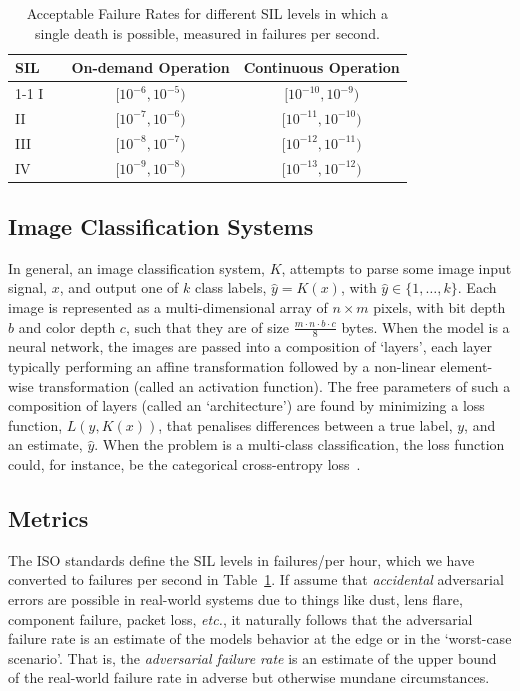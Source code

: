 \documentclass[lettersize,journal]{IEEEtran}
\begin{document}
\begin{table}[!h]
    \begin{center}
        \caption{Acceptable Failure Rates for different SIL levels in which a single death is possible, measured in failures per second.}
        \begin{tabular}{l c cc}
            \toprule
            SIL  && On-demand Operation   & Continuous Operation \\
            \cmidrule{1-1} \cmidrule{3-4}
            I     && $[10^{-6}, 10^{-5})$  & $[10^{-10}, 10^{-9})$ \\
            II    && $[10^{-7}, 10^{-6})$  & $[10^{-11}, 10^{-10})$ \\
            III   && $[10^{-8}, 10^{-7})$  & $[10^{-12}, 10^{-11})$ \\
            IV    && $[10^{-9}, 10^{-8})$  & $[10^{-13}, 10^{-12})$ \\
            \bottomrule
        \end{tabular}
        \label{tab:rate}
    \end{center}
\end{table}

\subsection{Image Classification Systems}
\label{classification}
In general, an image classification system, $K$, attempts to parse some image input signal, $x$, and output one of $k$ class labels, $\hat{y} = K(x)$, with $\hat{y} \in \{1,\ldots,k\}$. Each image is represented as a multi-dimensional array of $n\times m$ pixels, with bit depth $b$ and color depth $c$, such that they are of size $\frac{m \cdot n \cdot b \cdot c}{8}$ bytes. When the model is a neural network, the images are passed into a composition of `layers', each layer typically performing an affine transformation followed by a non-linear element-wise transformation (called an activation function). The free parameters of such a composition of layers (called an `architecture') are found by minimizing a loss function, $L(y,K(x))$, that penalises differences between a true label, $y$, and an estimate, $\hat{y}$. When the problem is a multi-class classification, the loss function could, for instance, be the categorical cross-entropy loss~\cite{biggio_evasion_2013, tsipras_robustness_2019, croce_reliable_2020, carlini_towards_2017}.


\subsection{Metrics}
The ISO standards \cite{iso26262} define the SIL levels in failures/per hour, which we have converted to failures per second in Table~\ref{tab:rate}. If assume that \textit{accidental} adversarial errors are possible in real-world systems due to things like dust, lens flare, component failure, packet loss, \textit{etc.}, it naturally follows that the adversarial failure rate is an estimate of the models behavior at the edge or in the `worst-case scenario'. That is, the \textit{adversarial failure rate} is an estimate of the upper bound of the real-world failure rate in adverse but otherwise mundane circumstances.
\end{document}
